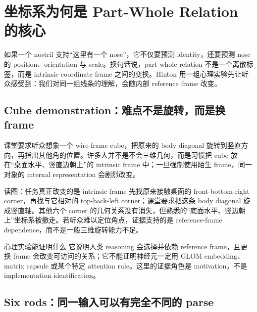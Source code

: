 \section{坐标系为何是 Part-Whole Relation 的核心}

如果一个 nostril 支持“这里有一个 nose”，它不仅要预测 identity，还要预测 nose 的 position、orientation 与 scale。换句话说，part-whole relation 不是一个离散标签，而是 intrinsic coordinate frame 之间的变换。Hinton 用一组心理实验先让听众感受到：我们对同一组线条的理解，会随内部 reference frame 改变。


\subsection{Cube demonstration：难点不是旋转，而是换 frame}

课堂要求听众想象一个 wire-frame cube，把原来的 body diagonal 旋转到竖直方向，再指出其他角的位置。许多人并不是不会三维几何，而是习惯把 cube 放在“桌面水平、竖直边朝上”的 intrinsic frame 中；一旦强制使用陌生 frame，同一对象的 internal representation 会剧烈改变。


\begin{knowledgebox}{读图：任务真正改变的是 intrinsic frame}
先找原来接触桌面的 front-bottom-right corner，再找与它相对的 top-back-left corner；课堂要求把这条 body diagonal 旋成竖直轴。其他六个 corner 的几何关系没有消失，但熟悉的“底面水平、竖边朝上”坐标系被撤走。若听众难以定位角点，证据支持的是 reference-frame dependence，而不是一般三维旋转能力不足。
\end{knowledgebox}

\begin{knowledgebox}{心理实验能证明什么}
它说明人类 reasoning 会选择并依赖 reference frame，且更换 frame 会改变可访问的关系；它不能证明神经元一定用 GLOM embedding、matrix capsule 或某个特定 attention rule。这里的证据角色是 motivation，不是 implementation identification。
\end{knowledgebox}

\subsection{Six rods：同一输入可以有完全不同的 parse}

